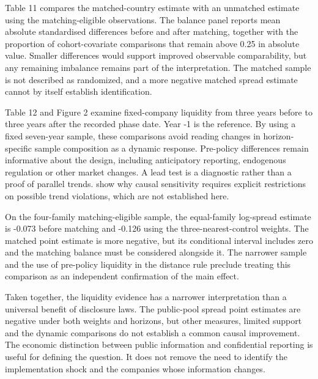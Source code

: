 \documentclass[12pt,letterpaper]{article}
\makeatletter
\renewcommand{\subsection}{\@startsection{subsection}{2}{\z@}{-3.25ex plus -1ex minus -.2ex}{1.5ex plus .2ex}{\normalfont\normalsize\bfseries}}
\makeatother
\begin{document}
\subsection{Matching and dynamics}

Table 11 compares the matched-country estimate with an unmatched estimate using the matching-eligible observations. The balance panel reports mean absolute standardised differences before and after matching, together with the proportion of cohort-covariate comparisons that remain above 0.25 in absolute value. Smaller differences would support improved observable comparability, but any remaining imbalance remains part of the interpretation. The matched sample is not described as randomized, and a more negative matched spread estimate cannot by itself establish identification.


Table 12 and Figure 2 examine fixed-company liquidity from three years before to three years after the recorded phase date. Year -1 is the reference. By using a fixed seven-year sample, these comparisons avoid reading changes in horizon-specific sample composition as a dynamic response. Pre-policy differences remain informative about the design, including anticipatory reporting, endogenous regulation or other market changes. A lead test is a diagnostic rather than a proof of parallel trends. \citet{rambachan2023} show why causal sensitivity requires explicit restrictions on possible trend violations, which are not established here.


On the four-family matching-eligible sample, the equal-family log-spread estimate is -0.073 before matching and -0.126 using the three-nearest-control weights. The matched point estimate is more negative, but its conditional interval includes zero and the matching balance must be considered alongside it. The narrower sample and the use of pre-policy liquidity in the distance rule preclude treating this comparison as an independent confirmation of the main effect.


Taken together, the liquidity evidence has a narrower interpretation than a universal benefit of disclosure laws. The public-pool spread point estimates are negative under both weights and horizons, but other measures, limited support and the dynamic comparisons do not establish a common causal improvement. The economic distinction between public information and confidential reporting is useful for defining the question. It does not remove the need to identify the implementation shock and the companies whose information changes.
\end{document}
